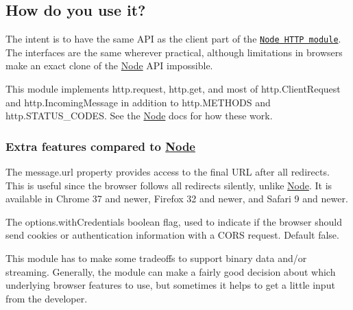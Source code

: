 \subsection*{How do you use it?}

The intent is to have the same A\+PI as the client part of the \href{https://nodejs.org/api/http.html}{\tt Node H\+T\+TP module}. The interfaces are the same wherever practical, although limitations in browsers make an exact clone of the \mbox{\hyperlink{classNode}{Node}} A\+PI impossible.

This module implements {\ttfamily http.\+request}, {\ttfamily http.\+get}, and most of {\ttfamily http.\+Client\+Request} and {\ttfamily http.\+Incoming\+Message} in addition to {\ttfamily http.\+M\+E\+T\+H\+O\+DS} and {\ttfamily http.\+S\+T\+A\+T\+U\+S\+\_\+\+C\+O\+D\+ES}. See the \mbox{\hyperlink{classNode}{Node}} docs for how these work.

\subsubsection*{Extra features compared to \mbox{\hyperlink{classNode}{Node}}}


\begin{DoxyItemize}
\item The {\ttfamily message.\+url} property provides access to the final U\+RL after all redirects. This is useful since the browser follows all redirects silently, unlike \mbox{\hyperlink{classNode}{Node}}. It is available in Chrome 37 and newer, Firefox 32 and newer, and Safari 9 and newer.
\item The {\ttfamily options.\+with\+Credentials} boolean flag, used to indicate if the browser should send cookies or authentication information with a C\+O\+RS request. Default false.
\end{DoxyItemize}

This module has to make some tradeoffs to support binary data and/or streaming. Generally, the module can make a fairly good decision about which underlying browser features to use, but sometimes it helps to get a little input from the developer.


